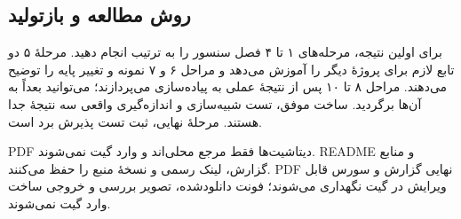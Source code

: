 \subsection{روش مطالعه و بازتولید}
برای اولین نتیجه، مرحله‌های ۱ تا ۴ فصل سنسور را به ترتیب انجام دهید. مرحلهٔ ۵ دو تابع لازم برای پروژهٔ دیگر را آموزش می‌دهد و مراحل ۶ و ۷ نمونه و تغییر پایه را توضیح می‌دهند. مراحل ۸ تا ۱۰ پس از نتیجۀ عملی به پیاده‌سازی می‌پردازند؛ می‌توانید بعداً به آن‌ها برگردید. ساخت موفق، تست شبیه‌سازی و اندازه‌گیری واقعی سه نتیجهٔ جدا هستند. مرحلهٔ نهایی، ثبت تست پذیرش برد است.

PDF دیتاشیت‌ها فقط مرجع محلی‌اند و وارد گیت نمی‌شوند. README و منابع گزارش، لینک رسمی و نسخهٔ منبع را حفظ می‌کنند. PDF نهایی گزارش و سورس قابل ویرایش در گیت نگهداری می‌شوند؛ فونت دانلودشده، تصویر بررسی و خروجی ساخت وارد گیت نمی‌شوند.
